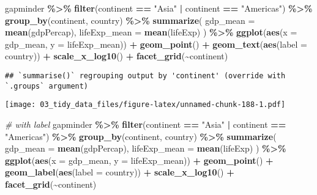 \documentclass[
]{book}
\newenvironment{Shaded}{\begin{snugshade}}{\end{snugshade}}
\newcommand{\CommentTok}[1]{\textcolor[rgb]{0.56,0.35,0.01}{\textit{#1}}}
\newcommand{\DataTypeTok}[1]{\textcolor[rgb]{0.13,0.29,0.53}{#1}}
\newcommand{\KeywordTok}[1]{\textcolor[rgb]{0.13,0.29,0.53}{\textbf{#1}}}
\newcommand{\NormalTok}[1]{#1}
\newcommand{\OperatorTok}[1]{\textcolor[rgb]{0.81,0.36,0.00}{\textbf{#1}}}
\newcommand{\StringTok}[1]{\textcolor[rgb]{0.31,0.60,0.02}{#1}}
\begin{document}
\begin{Shaded}
\begin{Highlighting}[]
\NormalTok{gapminder }\OperatorTok{\%\textgreater{}\%}
\StringTok{  }\KeywordTok{filter}\NormalTok{(continent }\OperatorTok{==}\StringTok{ "Asia"} \OperatorTok{|}\StringTok{ }\NormalTok{continent }\OperatorTok{==}\StringTok{ "Americas"}\NormalTok{) }\OperatorTok{\%\textgreater{}\%}
\StringTok{  }\KeywordTok{group\_by}\NormalTok{(continent, country) }\OperatorTok{\%\textgreater{}\%}
\StringTok{  }\KeywordTok{summarize}\NormalTok{(}
    \DataTypeTok{gdp\_mean =} \KeywordTok{mean}\NormalTok{(gdpPercap),}
    \DataTypeTok{lifeExp\_mean =} \KeywordTok{mean}\NormalTok{(lifeExp)}
\NormalTok{  ) }\OperatorTok{\%\textgreater{}\%}
\StringTok{  }\KeywordTok{ggplot}\NormalTok{(}\KeywordTok{aes}\NormalTok{(}\DataTypeTok{x =}\NormalTok{ gdp\_mean, }\DataTypeTok{y =}\NormalTok{ lifeExp\_mean)) }\OperatorTok{+}
\StringTok{  }\KeywordTok{geom\_point}\NormalTok{() }\OperatorTok{+}
\StringTok{  }\KeywordTok{geom\_text}\NormalTok{(}\KeywordTok{aes}\NormalTok{(}\DataTypeTok{label =}\NormalTok{ country)) }\OperatorTok{+}
\StringTok{  }\KeywordTok{scale\_x\_log10}\NormalTok{() }\OperatorTok{+}
\StringTok{  }\KeywordTok{facet\_grid}\NormalTok{(}\OperatorTok{\textasciitilde{}}\NormalTok{continent)}
\end{Highlighting}
\end{Shaded}

\begin{verbatim}
## `summarise()` regrouping output by 'continent' (override with `.groups` argument)
\end{verbatim}

\texttt{[image: 03\_tidy\_data\_files/figure-latex/unnamed-chunk-188-1.pdf]}

\begin{Shaded}
\begin{Highlighting}[]
\CommentTok{\# with label}
\NormalTok{gapminder }\OperatorTok{\%\textgreater{}\%}
\StringTok{  }\KeywordTok{filter}\NormalTok{(continent }\OperatorTok{==}\StringTok{ "Asia"} \OperatorTok{|}\StringTok{ }\NormalTok{continent }\OperatorTok{==}\StringTok{ "Americas"}\NormalTok{) }\OperatorTok{\%\textgreater{}\%}
\StringTok{  }\KeywordTok{group\_by}\NormalTok{(continent, country) }\OperatorTok{\%\textgreater{}\%}
\StringTok{  }\KeywordTok{summarize}\NormalTok{(}
    \DataTypeTok{gdp\_mean =} \KeywordTok{mean}\NormalTok{(gdpPercap),}
    \DataTypeTok{lifeExp\_mean =} \KeywordTok{mean}\NormalTok{(lifeExp)}
\NormalTok{  ) }\OperatorTok{\%\textgreater{}\%}
\StringTok{  }\KeywordTok{ggplot}\NormalTok{(}\KeywordTok{aes}\NormalTok{(}\DataTypeTok{x =}\NormalTok{ gdp\_mean, }\DataTypeTok{y =}\NormalTok{ lifeExp\_mean)) }\OperatorTok{+}
\StringTok{  }\KeywordTok{geom\_point}\NormalTok{() }\OperatorTok{+}
\StringTok{  }\KeywordTok{geom\_label}\NormalTok{(}\KeywordTok{aes}\NormalTok{(}\DataTypeTok{label =}\NormalTok{ country)) }\OperatorTok{+}
\StringTok{  }\KeywordTok{scale\_x\_log10}\NormalTok{() }\OperatorTok{+}
\StringTok{  }\KeywordTok{facet\_grid}\NormalTok{(}\OperatorTok{\textasciitilde{}}\NormalTok{continent)}
\end{Highlighting}
\end{Shaded}
\end{document}

